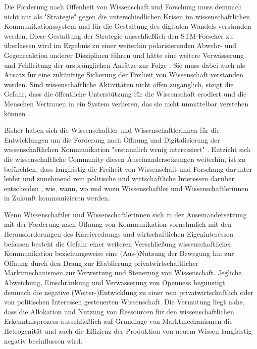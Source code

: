 Die Forderung nach Offenheit von Wissenschaft und Forschung muss demnach nicht nur als "Strategie" gegen die unterschiedlichen Krisen im wissenschaftlichen Kommunikationssystem und für die Gestaltung des digitalen Wandels verstanden werden. Diese Gestaltung der Strategie ausschließlich den STM-Forscher zu überlassen wird im Ergebnis zu einer weiterhin polarisierenden Abwehr- und Gegenreaktion anderer Disziplinen führen und hätte eine weitere Verwässerung und Fehlleitung der ursprünglichen Ansätze zur Folge \cite{naeder_2010_open}. Sie muss dabei auch als Ansatz für eine zukünftige Sicherung der Freiheit von Wissenschaft verstanden werden. Sind wissenschaftliche Aktivitäten nicht offen zugänglich, steigt die Gefahr, dass die öffentliche Unterstützung für die Wissenschaft erodiert und die Menschen Vertrauen in ein System verlieren, das sie nicht unmittelbar verstehen können \cite{resnik_2005_ethics}.

Bisher haben sich die Wissenschaftler und Wissenschaftlerinnen für die Entwicklungen um die Forderung nach Öffnung und Digitalisierung der wissenschaftlichen Kommunikation "erstaunlich wenig interessiert" \cite{hagner_2015_sache_buches}. Entzieht sich die wissenschaftliche Community diesen Auseinandersetzungen weiterhin, ist zu befürchten, dass langfristig die Freiheit von Wissenschaft und Forschung darunter leidet und zunehmend rein politische und wirtschaftliche Interessen darüber entscheiden \cite{Warnke_2012}, wie, wann, wo und wozu Wissenschaftler und Wissenschaftlerinnen in Zukunft kommunizieren werden.

Wenn Wissenschaftler und Wissenschaftlerinnen sich in der Auseinandersetzung mit der Forderung nach Öffnung von Kommunikation vornehmlich mit den Herausforderungen des Karrieredrangs und wirtschaftlichen Eigeninteressen befassen \cite{resnik_2005_ethics} besteht die Gefahr einer weiteren Verschließung wissenschaftlicher Kommunikation beziehungsweise eine (Aus-)Nutzung der Bewegung hin zur Öffnung durch den Drang zur Etablierung privatwirtschaftlicher Marktmechanismen zur Verwertung und Steuerung von Wissenschaft. Jegliche Abweichung, Einschränkung und Verwässerung von Openness begünstigt demnach die negative (Weiter-)Entwicklung zu einer rein privatwirtschaftlich oder von politischen Interessen gesteuerten Wissenschaft. Die Vermutung liegt nahe, dass die Allokation und Nutzung von Ressourcen für den wissenschaftlichen Erkenntnisprozess ausschließlich auf Grundlage von Marktmechanismen die Hetrogenität und auch die Effizienz der Produktion von neuem Wissen langfristig negativ beeinflussen wird.

